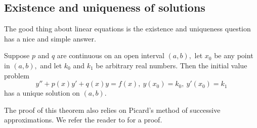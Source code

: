 \subsection{Existence and uniqueness of solutions}

The good thing about linear equations is the existence and uniqueness question has a nice and simple answer.

\begin{theorem}\label{thm:SeconOrderUniqueness}
  Suppose $p$ and $q$ are continuous on an open interval $(a,b),$ let $x_0$ be any point in $(a,b),$ and let $k_0$ and $k_1$ be arbitrary real numbers$.$ Then the initial value problem
\[y''+p(x)y'+q(x)y=f(x),\ y(x_0)=k_0,\ y'(x_0)=k_1\]
has a unique solution on $(a,b).$
\end{theorem}
The proof of this theorem also relies on Picard’s method of successive approximations. 
We refer the reader to \autocite[Chapter 13]{Simmons2016} for a proof.

